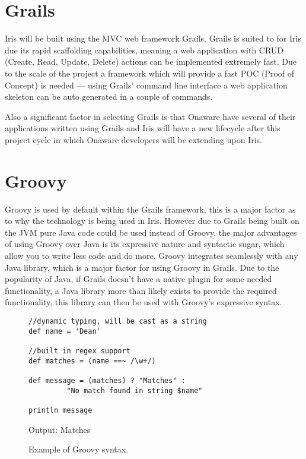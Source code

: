 \documentclass[12pt,a4paper,titlepage]{report}
\begin{document}
\section{Grails}

Iris will be built using the MVC web framework Grails. Grails is suited to for Iris due its rapid scaffolding capabilities, meaning a web application with CRUD (Create, Read, Update, Delete) actions can be implemented extremely fast. Due to the scale of the project a framework which will provide a fast POC (Proof of Concept) is needed --- using Grails' command line interface a web application skeleton can be auto generated in a couple of commands. 

Also a significant factor in selecting Grails is that Onaware have several of their applications written using Grails and Iris will have a new lifecycle after this project cycle in which Onaware developers will be extending upon Iris. 

\section{Groovy}

Groovy is used by default within the Grails framework, this is a major factor as to why the technology is being used in Iris. However due to Grails being built on the JVM pure Java code could be used instead of Groovy, the major advantages of using Groovy over Java is its expressive nature and syntactic sugar, which allow you to write less code and do more. Groovy integrates seamlessly with any Java library, which is a major factor for using Groovy in Grails. Due to the popularity of Java, if Grails doesn't have a native plugin for some needed functionality, a Java library more than likely exists to provide the required functionality, this library can then be used with Groovy's expressive syntax.

\begin{figure}[H]
\begin{tcolorbox}
\begin{verbatim}
//dynamic typing, will be cast as a string
def name = 'Dean'

//built in regex support
def matches = (name ==~ /\w+/)   

def message = (matches) ? "Matches" :
		 "No match found in string $name"

println message
\end{verbatim}
Output:
Matches
\end{tcolorbox}
\caption{Example of Groovy syntax.}
\end{figure}
\end{document}
